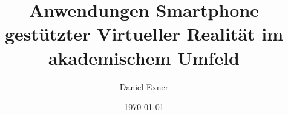 \documentclass[
pdftex,
a4paper,
12pt,
oneside,
idxtotoc,
halfparskip,
titlepage,
bibtotoc,
liststotoc
]{scrbook}
\author{Daniel Exner}
\title{Anwendungen Smartphone gestützter Virtueller Realität im akademischem
Umfeld}
\date{\today}
\begin{document}
\frontmatter

\tableofcontents
\listoffigures
\listoftables
\onehalfspace




\mainmatter
\theoremstyle{definition}
\newtheorem{defi}{Definition}










\backmatter
\newpage


\printindex
\pagestyle{plain}
\appendix

\newpage


\printindex
\end{document}
